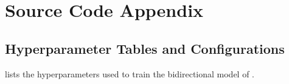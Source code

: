 \chapter{Source Code Appendix}
\label{ch:appendix}



\section{Hyperparameter Tables and Configurations}

 lists the hyperparameters used to train the bidirectional model of .

